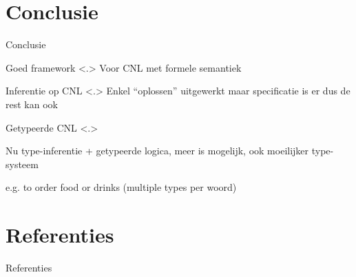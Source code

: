 \documentclass[notes, dvipsnames]{beamer}
\newcommand{\hitem}{
	\ppause
	\item
}
\newcommand{\ppause}{\onslide<+>}
\newcommand{\nnote}[1]{\note<.>{#1}}
\begin{document}
  \section{Conclusie}
  \begin{frame}{Conclusie}
    \begin{itemize}
      \hitem Goed framework
      \nnote{ Voor CNL met formele semantiek}
      \hitem Inferentie op CNL
      \nnote{ Enkel ``oplossen'' uitgewerkt maar specificatie is er dus de rest kan ook }
      \hitem Getypeerde CNL
      \nnote{ Nu type-inferentie + getypeerde logica, meer is mogelijk, ook moeilijker type-systeem
      \item e.g. to order food or drinks (multiple types per woord)}
    \end{itemize}
  \end{frame}

			
	\section{Referenties}
	\begin{frame}[allowframebreaks]{Referenties}
		
		
	\end{frame}
	
\end{document}
